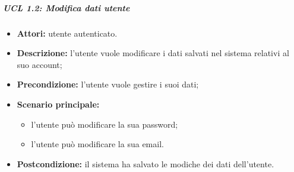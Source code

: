  
\subparagraph{UCL 1.2: Modifica dati utente} %
\begin{itemize}
	\item \textbf{Attori:} utente autenticato.
	\item \textbf{Descrizione:} l'utente vuole modificare i dati salvati nel sistema relativi al suo account;
	\item \textbf{Precondizione:} l'utente vuole gestire i suoi dati;
	\item \textbf{Scenario principale:}
	\begin{itemize}
		\item l'utente può modificare la sua password;
		\item l'utente può modificare la sua email.
	\end{itemize}
\item \textbf{Postcondizione:} il sistema ha salvato le modiche dei dati dell'utente.
\end{itemize}

\iffalse %
\subparagraph{UCL 1.2.1: Modifica username}
\begin{itemize}
	\item \textbf{Attori:} utente autenticato.
	\item \textbf{Descrizione:} l'utente inserisce il proprio username, e se lo username risulta non è gia stato utilizzato da un altro utente, allora la modifica verrà salvata dal sistema
	\item \textbf{Precondizione:} l'utente vuole modicare il suo username.
	\item \textbf{Scenario principale:}
	\begin{itemize}
		\item l'utente inserisce il nuovo username scelto.
	\end{itemize}
	\item \textbf{Scenario alternativo:}
	\begin{itemize}
		\item il nuovo username è gia presente nel sistema, ne viene data comunicazione dell'errore e della possibilità di reinserire un username diverso.
	\end{itemize}
\item \textbf{Postcondizione:} il cambiamento di username viene salvato dal sistema.
\end{itemize}
\fi

